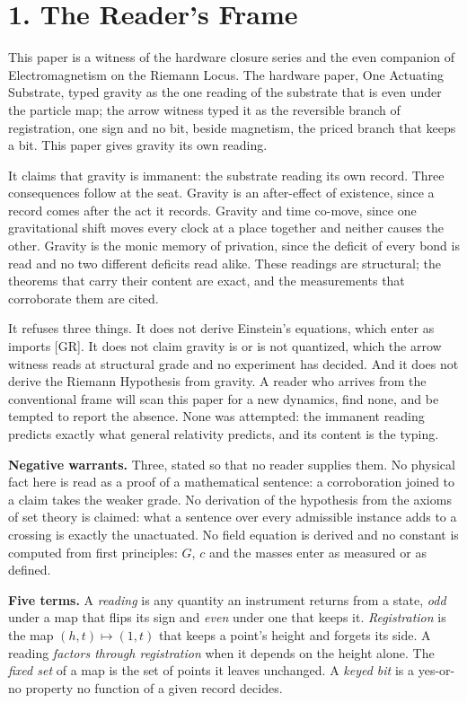 \documentclass[10pt]{article}
\begin{document}
\hypertarget{the-readers-frame}{%
\section{1. The Reader's Frame}\label{the-readers-frame}}

This paper is a witness of the hardware closure series and the even
companion of Electromagnetism on the Riemann Locus. The hardware paper,
One Actuating Substrate, typed gravity as the one reading of the
substrate that is even under the particle map; the arrow witness typed
it as the reversible branch of registration, one sign and no bit, beside
magnetism, the priced branch that keeps a bit. This paper gives gravity
its own reading.

It claims that gravity is immanent: the substrate reading its own
record. Three consequences follow at the seat. Gravity is an
after-effect of existence, since a record comes after the act it
records. Gravity and time co-move, since one gravitational shift moves
every clock at a place together and neither causes the other. Gravity is
the monic memory of privation, since the deficit of every bond is read
and no two different deficits read alike. These readings are structural;
the theorems that carry their content are exact, and the measurements
that corroborate them are cited.

It refuses three things. It does not derive Einstein's equations, which
enter as imports {[}GR{]}. It does not claim gravity is or is not
quantized, which the arrow witness reads at structural grade and no
experiment has decided. And it does not derive the Riemann Hypothesis
from gravity. A reader who arrives from the conventional frame will scan
this paper for a new dynamics, find none, and be tempted to report the
absence. None was attempted: the immanent reading predicts exactly what
general relativity predicts, and its content is the typing.

\textbf{Negative warrants.} Three, stated so that no reader supplies
them. No physical fact here is read as a proof of a mathematical
sentence: a corroboration joined to a claim takes the weaker grade. No
derivation of the hypothesis from the axioms of set theory is claimed:
what a sentence over every admissible instance adds to a crossing is
exactly the unactuated. No field equation is derived and no constant is
computed from first principles: \(G\), \(c\) and the masses enter as
measured or as defined.

\textbf{Five terms.} A \emph{reading} is any quantity an instrument
returns from a state, \emph{odd} under a map that flips its sign and
\emph{even} under one that keeps it. \emph{Registration} is the map
\((h,t)\mapsto(1,t)\) that keeps a point's height and forgets its side.
A reading \emph{factors through registration} when it depends on the
height alone. The \emph{fixed set} of a map is the set of points it
leaves unchanged. A \emph{keyed bit} is a yes-or-no property no function
of a given record decides.
\end{document}
